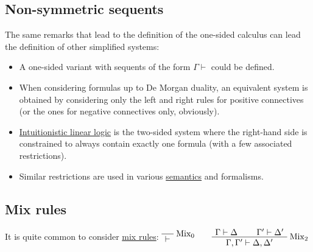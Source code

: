\subsection{Non-symmetric sequents}\label{non-symmetric-sequents}

The same remarks that lead to the definition of the one-sided calculus
can lead the definition of other simplified systems:

\begin{itemize}
\item A one-sided variant with sequents of the form \(\Gamma\vdash\) could
  be defined.
\item When considering formulas up to De Morgan duality, an equivalent
  system is obtained by considering only the left and right rules for
  positive connectives (or the ones for negative connectives only,
  obviously).
\item \hyperref[intuitionistic-linear-logic]{Intuitionistic linear logic} is the
  two-sided system where the right-hand side is constrained to always
  contain exactly one formula (with a few associated restrictions).
\item Similar restrictions are used in various \hyperref[semantics]{semantics} and  formalisms.
\end{itemize}

\subsection{Mix rules}\label{mix-rules}

It is quite common to consider \hyperref[mix]{mix rules}:
\(\LabelRule{\rulename{Mix}_0}
\NulRule{\vdash}
\DisplayProof
\qquad
\AxRule{\Gamma \vdash \Delta}
\AxRule{\Gamma' \vdash \Delta'}
\LabelRule{\rulename{Mix}_2}
\BinRule{\Gamma,\Gamma' \vdash \Delta,\Delta'}
\DisplayProof\)


